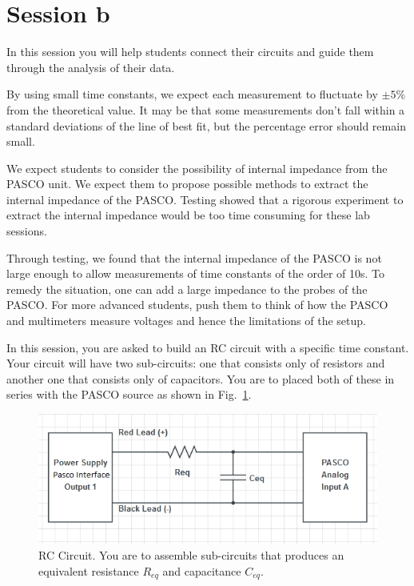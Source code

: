 \documentclass[12pt]{report}
\begin{document}
\section{Session b}
\begin{tcolorbox}[title=Session \#2]
In this session you will help students connect their circuits and guide them through the analysis of their data.
\end{tcolorbox}
\begin{tcolorbox}
By using small time constants, we expect each measurement to fluctuate by $\pm 5$\% from the theoretical value. It may be that some  measurements don't fall within a standard deviations of the line of best fit, but the percentage error should remain small.
\end{tcolorbox}
\begin{tcolorbox}
We expect students to consider the possibility of internal impedance from the PASCO unit. We expect them to propose possible methods to extract the internal impedance of the PASCO. Testing showed that a rigorous experiment to extract the internal impedance would be too time consuming for these lab sessions.
\end{tcolorbox}
\begin{tcolorbox}
Through testing, we found that the internal impedance of the PASCO is not large enough to allow measurements of time constants of the order of 10s. To remedy the situation, one can add a large impedance to the probes of the PASCO. For more advanced students, push them to think of how the PASCO and multimeters measure voltages and hence the limitations of the setup.
\end{tcolorbox}

In this session, you are asked to build an RC circuit with a specific time constant. Your circuit will have two sub-circuits: one that consists only of resistors and another one that consists only of capacitors. You are to placed both of these in series with the PASCO source as shown in Fig.~\ref{Fig:lab2-session2-circuit}.

\begin{figure}[h]
\centering
\includegraphics[width=0.9\linewidth]{lab2-session2-circuit}
\caption{RC Circuit. You are to assemble sub-circuits that produces an equivalent resistance $R_{eq}$ and capacitance $C_{eq}$.}
\label{Fig:lab2-session2-circuit}
\end{figure}
\end{document}
